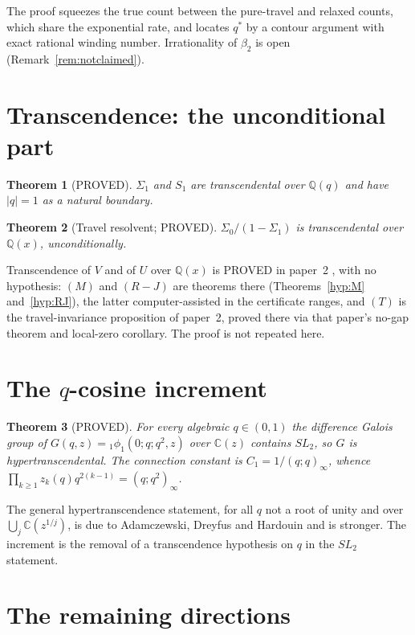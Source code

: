 \documentclass[11pt]{article}
\newtheorem{theorem}{Theorem}[section]
\theoremstyle{definition}
\theoremstyle{remark}
\theoremstyle{definition}
\newcommand{\Q}{\mathbb{Q}}
\newcommand{\C}{\mathbb{C}}
\begin{document}
The proof squeezes the true count between the pure-travel and relaxed counts, which share the
exponential rate, and locates $q^\ast$ by a contour argument with exact rational winding number.
Irrationality of $\beta_2$ is open (Remark~\ref{rem:notclaimed}).

\section{Transcendence: the unconditional part}\label{sec:trans}

\begin{theorem}[PROVED]\label{thm:pc}
$\Sigma_1$ and $S_1$ are transcendental over $\Q(q)$ and have $|q|=1$ as a natural boundary.
\end{theorem}

\begin{theorem}[Travel resolvent; PROVED]\label{thm:travel}
$\Sigma_0/(1-\Sigma_1)$ is transcendental over $\Q(x)$, unconditionally.
\end{theorem}

Transcendence of $V$ and of $U$ over $\Q(x)$ is PROVED in paper~2 \cite{paper2}, with no
hypothesis: $(M)$ and $(R\!-\!J)$ are theorems there (Theorems~\ref{hyp:M} and~\ref{hyp:RJ}), the
latter computer-assisted in the certificate ranges, and $(T)$ is the travel-invariance
proposition of paper~2, proved there via that paper's no-gap theorem and local-zero corollary.
The proof is not repeated here.

\section{The \texorpdfstring{$q$}{q}-cosine increment}\label{sec:qcos}

\begin{theorem}[PROVED]\label{thm:qcos}
For every algebraic $q\in(0,1)$ the difference Galois group of
$G(q,z)={}_1\phi_1(0;q;q^2,z)$ over $\C(z)$ contains $SL_2$, so $G$ is hypertranscendental. The
connection constant is $C_1=1/(q;q)_\infty$, whence
$\prod_{k\ge1}z_k(q)q^{2(k-1)}=(q;q^2)_\infty$.
\end{theorem}

The general hypertranscendence statement, for all $q$ not a root of unity and over
$\bigcup_j\C(z^{1/j})$, is due to Adamczewski, Dreyfus and Hardouin and is stronger. The increment
is the removal of a transcendence hypothesis on $q$ in the $SL_2$ statement.

\section{The remaining directions}\label{sec:open}
\end{document}
